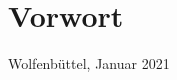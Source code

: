 \thispagestyle{empty}
\setcounter{page}{0}

\section*{Vorwort}
\label{sec:Vorwort}


\begin{flushright}
	Wolfenbüttel, Januar 2021
\end{flushright}



\clearpage

